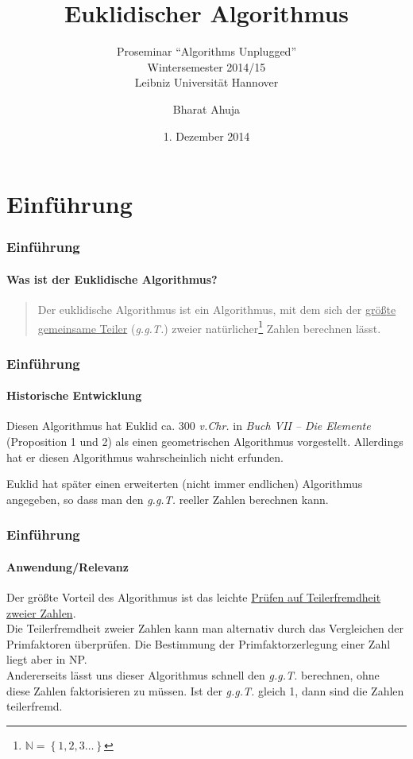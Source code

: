 \documentclass[•]{beamer}
\title{Euklidischer Algorithmus}
\subtitle{Proseminar ``Algorithms Unplugged''\\
Wintersemester 2014/15\\ 
Leibniz Universit\"at Hannover}
\date{1. Dezember 2014}
\author{Bharat Ahuja}
\begin{document}
\maketitle


\section{Einf\"uhrung}
\begin{frame}
	\frametitle{Einf\"uhrung}
    \framesubtitle{Was ist der Euklidische Algorithmus?}
    \begin{quote}
    Der euklidische Algorithmus ist ein Algorithmus, mit dem sich der 		\underline{gr\"o{\ss}te gemeinsame Teiler} (\textit{g.g.T.}) zweier nat\"urlicher\footnote{$\mathbb{N} =  \left\{ 1,2,3\dots \right\}$} Zahlen berechnen l\"asst. 
    
    \end{quote} 
\end{frame}

\begin{frame}       
	\frametitle{Einf\"uhrung}
    \framesubtitle{Historische Entwicklung}
    Diesen Algorithmus hat Euklid ca. 300 \textit{v.Chr.} in 				\textit{Buch VII -- Die Elemente} (Proposition 1 und 2) als einen 		geometrischen Algorithmus vorgestellt. Allerdings hat er diesen Algorithmus wahrscheinlich nicht erfunden.
    
    Euklid hat sp\"ater einen erweiterten (nicht immer endlichen) Algorithmus angegeben, so dass man den \textit{g.g.T.} reeller Zahlen berechnen kann.\end{frame}

\begin{frame}
	\frametitle{Einf\"uhrung}
    \framesubtitle{Anwendung/Relevanz}
    Der gr\"o{\ss}te Vorteil des Algorithmus ist das leichte \underline{Pr\"ufen auf Teilerfremdheit zweier Zahlen}. \\ Die Teilerfremdheit zweier Zahlen kann man alternativ durch das Vergleichen der Primfaktoren \"uberpr\"ufen. Die Bestimmung der Primfaktorzerlegung einer Zahl liegt aber in NP. \\ Andererseits l\"asst uns dieser Algorithmus schnell den \textit{g.g.T.} berechnen, ohne diese Zahlen faktorisieren zu m\"ussen. Ist der \textit{g.g.T.} gleich 1, dann sind die Zahlen teilerfremd.
    
\end{frame}
\end{document}
